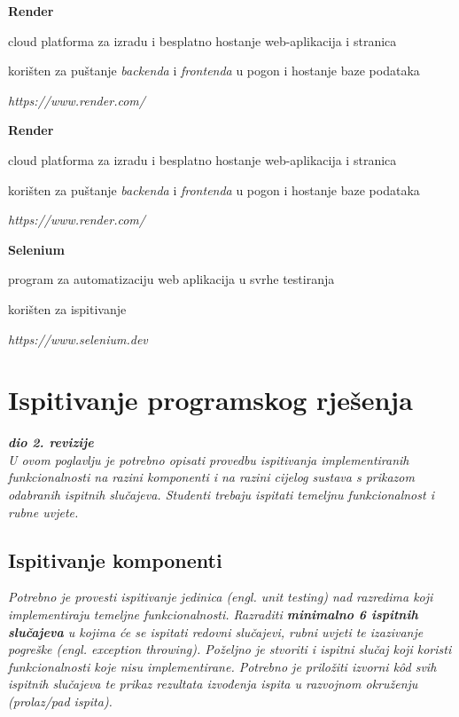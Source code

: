 \begin{packed_item}
				\item \textbf{Render}
				\begin{packed_item}
					\item cloud platforma za izradu i besplatno hostanje web-aplikacija i stranica
					\item korišten za puštanje \textit{backenda} i \textit{frontenda} u pogon i hostanje baze podataka
					\item \textit{https://www.render.com/}
				\end{packed_item}

				\item \textbf{Render}
				\begin{packed_item}
					\item cloud platforma za izradu i besplatno hostanje web-aplikacija i stranica
					\item korišten za puštanje \textit{backenda} i \textit{frontenda} u pogon i hostanje baze podataka
					\item \textit{https://www.render.com/}
				\end{packed_item}

				\item \textbf{Selenium}
				\begin{packed_item}
					\item program za automatizaciju web aplikacija u svrhe testiranja
					\item korišten za ispitivanje
					\item \textit{https://www.selenium.dev}
				\end{packed_item}
			\end{packed_item}
			

			 \eject 
		
	
		\section{Ispitivanje programskog rješenja}
			
			\textbf{\textit{dio 2. revizije}}\\
			
			 \textit{U ovom poglavlju je potrebno opisati provedbu ispitivanja implementiranih funkcionalnosti na razini komponenti i na razini cijelog sustava s prikazom odabranih ispitnih slučajeva. Studenti trebaju ispitati temeljnu funkcionalnost i rubne uvjete.}
	
			
			\subsection{Ispitivanje komponenti}
			\textit{Potrebno je provesti ispitivanje jedinica (engl. unit testing) nad razredima koji implementiraju temeljne funkcionalnosti. Razraditi \textbf{minimalno 6 ispitnih slučajeva} u kojima će se ispitati redovni slučajevi, rubni uvjeti te izazivanje pogreške (engl. exception throwing). Poželjno je stvoriti i ispitni slučaj koji koristi funkcionalnosti koje nisu implementirane. Potrebno je priložiti izvorni kôd svih ispitnih slučajeva te prikaz rezultata izvođenja ispita u razvojnom okruženju (prolaz/pad ispita). }
			
